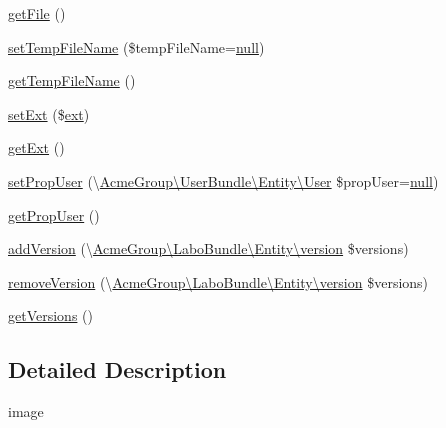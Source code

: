 \begin{DoxyCompactItemize}
\item 
\hyperlink{class_acme_group_1_1_labo_bundle_1_1_entity_1_1image_a31f97aea0c55ec15828654068eb87b6d}{get\+File} ()
\item 
\hyperlink{class_acme_group_1_1_labo_bundle_1_1_entity_1_1image_a56f9a2bb4d315db8aff607d8584e3a03}{set\+Temp\+File\+Name} (\$temp\+File\+Name=\hyperlink{validate_8js_afb8e110345c45e74478894341ab6b28e}{null})
\item 
\hyperlink{class_acme_group_1_1_labo_bundle_1_1_entity_1_1image_ac54c8b7d2e6bc7c72d19c035e4aaa6f6}{get\+Temp\+File\+Name} ()
\item 
\hyperlink{class_acme_group_1_1_labo_bundle_1_1_entity_1_1image_af0903d6241cae1feb7beda1484816ae9}{set\+Ext} (\$\hyperlink{model_8ext_8js_a3ee7f56eeb48b6dc8bb1b162befb009f}{ext})
\item 
\hyperlink{class_acme_group_1_1_labo_bundle_1_1_entity_1_1image_acd755f06dcf4c3c798d34ce02e5557f3}{get\+Ext} ()
\item 
\hyperlink{class_acme_group_1_1_labo_bundle_1_1_entity_1_1image_a432d51b5291a86fcfdbaa7c8a5a09cc0}{set\+Prop\+User} (\textbackslash{}\hyperlink{class_acme_group_1_1_user_bundle_1_1_entity_1_1_user}{Acme\+Group\textbackslash{}\+User\+Bundle\textbackslash{}\+Entity\textbackslash{}\+User} \$prop\+User=\hyperlink{validate_8js_afb8e110345c45e74478894341ab6b28e}{null})
\item 
\hyperlink{class_acme_group_1_1_labo_bundle_1_1_entity_1_1image_a436d9b9dd643428c67e8a6421c937546}{get\+Prop\+User} ()
\item 
\hyperlink{class_acme_group_1_1_labo_bundle_1_1_entity_1_1image_aad445b5bbc1fd6c76031f0835cc48faa}{add\+Version} (\textbackslash{}\hyperlink{class_acme_group_1_1_labo_bundle_1_1_entity_1_1version}{Acme\+Group\textbackslash{}\+Labo\+Bundle\textbackslash{}\+Entity\textbackslash{}version} \$versions)
\item 
\hyperlink{class_acme_group_1_1_labo_bundle_1_1_entity_1_1image_acd7c38e8673b394a5023bbe30b5e3711}{remove\+Version} (\textbackslash{}\hyperlink{class_acme_group_1_1_labo_bundle_1_1_entity_1_1version}{Acme\+Group\textbackslash{}\+Labo\+Bundle\textbackslash{}\+Entity\textbackslash{}version} \$versions)
\item 
\hyperlink{class_acme_group_1_1_labo_bundle_1_1_entity_1_1image_aec6c35f443aeacabbeb328deac5aefde}{get\+Versions} ()
\end{DoxyCompactItemize}


\subsection{Detailed Description}
image

